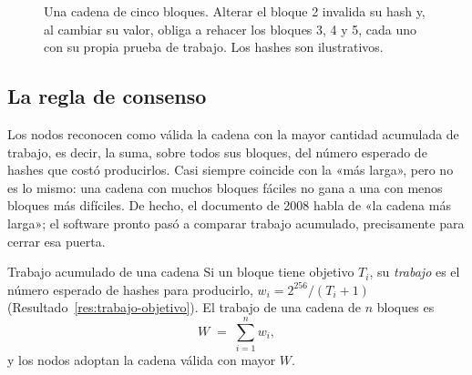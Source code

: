 \documentclass[11pt,a4paper]{article}
\begin{document}
\begin{figure}[tbp]
{}
\caption{Una cadena de cinco bloques. Alterar el bloque 2 invalida su hash y, al cambiar su valor, obliga a rehacer los bloques 3, 4 y 5, cada uno con su propia prueba de trabajo. Los hashes son ilustrativos.}\label{fig:cadena}
\end{figure}

\subsection{La regla de consenso}

Los nodos reconocen como válida la cadena con la mayor cantidad acumulada de trabajo, es decir, la suma, sobre todos sus bloques, del número esperado de hashes que costó producirlos. Casi siempre coincide con la «más larga», pero no es lo mismo: una cadena con muchos bloques fáciles no gana a una con menos bloques más difíciles. De hecho, el documento de 2008 habla de «la cadena más larga»; el software pronto pasó a comparar trabajo acumulado, precisamente para cerrar esa puerta.

\begin{definicion}{Trabajo acumulado de una cadena}\label{def:trabajo}
Si un bloque tiene objetivo $T_i$, su \emph{trabajo} es el número esperado de hashes para producirlo, $w_i=2^{256}/(T_i+1)$ (Resultado~\ref{res:trabajo-objetivo}). El trabajo de una cadena de $n$ bloques es
\[
  W\;=\;\sum_{i=1}^{n} w_i ,
\]
y los nodos adoptan la cadena válida con mayor $W$.
\end{definicion}
\end{document}
